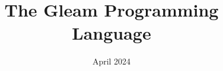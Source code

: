 \documentclass[a4paper,12pt]{book}
\begin{document}
\title{The Gleam Programming Language}
\date{April 2024}

\frontmatter
\maketitle
\tableofcontents

\mainmatter



\backmatter
\end{document}

